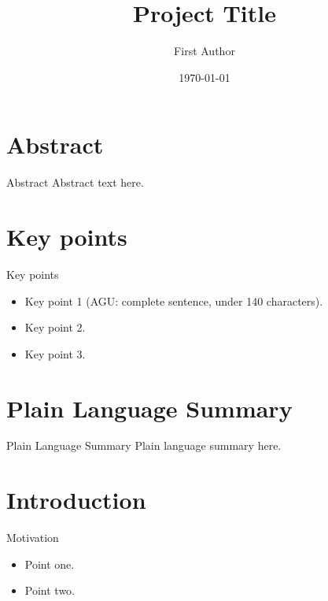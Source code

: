 \documentclass[aspectratio=169,xcolor=dvipsnames]{beamer}
\title[Project Title]{Project Title}
\author[First Author]{First Author}
\institute{Institution}
\date{\today}
\begin{document}
\begin{frame}
  \titlepage
\end{frame}



\section*{Abstract}
\begin{frame}{Abstract}
  Abstract text here.
\end{frame}

\section*{Key points}
\begin{frame}{Key points}
  \begin{itemize}
    \item Key point 1 (AGU: complete sentence, under 140 characters).
    \item Key point 2.
    \item Key point 3.
  \end{itemize}
\end{frame}

\section*{Plain Language Summary}
\begin{frame}{Plain Language Summary}
  Plain language summary here.
\end{frame}

\section{Introduction}

\begin{frame}{Motivation}
  \begin{itemize}
    \item Point one.
    \item Point two.
  \end{itemize}
\end{frame}
\end{document}

